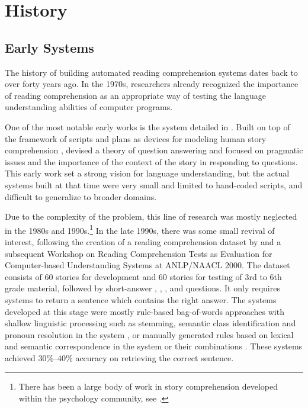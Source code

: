 
\section{History}
\label{sec:rc-history}

\subsection{Early Systems}
The history of building automated reading comprehension systems dates back to over forty years ago. In the 1970s, researchers already recognized the importance of reading comprehension as an appropriate way of testing the language understanding abilities of computer programs.


One of the most notable early works is the  system detailed in . Built on top of the framework of scripts and plans as devices for modeling human story comprehension \cite{schank1977scripts},  devised a theory of question answering and focused on pragmatic issues and the importance of the context of the story in responding to questions. This early work set a strong vision for language understanding, but the actual systems built at that time were very small and limited to hand-coded scripts, and difficult to generalize to broader domains.

Due to the complexity of the problem, this line of research was mostly neglected in the 1980s and 1990s.\footnote{There has been a large body of work in story comprehension developed within the psychology community, see \cite{kintsch1998comprehension}.} In the late 1990s, there was some small revival of interest, following the creation of a reading comprehension dataset by  and a subsequent Workshop on Reading Comprehension Tests as Evaluation for Computer-based Understanding Systems at ANLP/NAACL 2000. The dataset consists of 60 stories for development and 60 stories for testing of 3rd to 6th grade material, followed by short-answer , , ,  and  questions. It only requires systems to return a sentence which contains the right answer. The systems developed at this stage were mostly rule-based bag-of-words approaches with shallow linguistic processing such as stemming, semantic class identification and pronoun resolution in the  system \cite{hirschman1999deep}, or manually generated rules based on lexical and semantic correspondence in the  system \cite{riloff2000rule} or their combinations \cite{charniak2000reading}. These systems achieved $30\%$--$40\%$ accuracy on retrieving the correct sentence.

